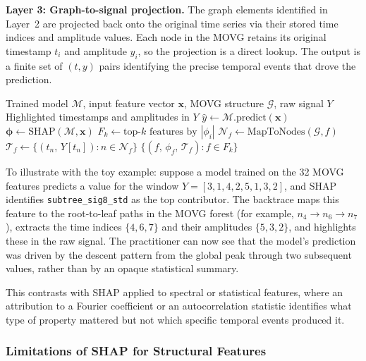 \documentclass[a4paper,12pt]{article}
\begin{document}
\textbf{Layer 3: Graph-to-signal projection.} The graph elements identified in Layer~2 are projected back onto the original time series via their stored time indices and amplitude values. Each node in the MOVG retains its original timestamp $t_i$ and amplitude $y_i$, so the projection is a direct lookup. The output is a finite set of $(t, y)$ pairs identifying the precise temporal events that drove the prediction.

\begin{algorithm}[H]
\caption{Post-Inference Backtrace}
\label{alg:backtrace}
\begin{algorithmic}[1]
\Require Trained model $\mathcal{M}$, input feature vector $\mathbf{x}$, MOVG structure $\mathcal{G}$, raw signal $Y$
\Ensure Highlighted timestamps and amplitudes in $Y$
    \State $\hat{y} \gets \mathcal{M}.\text{predict}(\mathbf{x})$
    \State $\boldsymbol{\phi} \gets \text{SHAP}(\mathcal{M}, \mathbf{x})$ 
    \State $F_k \gets \text{top-}k\text{ features by } |\phi_i|$
        \State $\mathcal{N}_f \gets \text{MapToNodes}(\mathcal{G}, f)$ 
        \State $\mathcal{T}_f \gets \{(t_n,\, Y[t_n]) : n \in \mathcal{N}_f\}$ 
    \EndFor
    \State \Return $\{(f,\, \phi_f,\, \mathcal{T}_f) : f \in F_k\}$
\EndFunction
\end{algorithmic}
\end{algorithm}

To illustrate with the toy example: suppose a model trained on the 32 MOVG features predicts a value for the window $Y = [3, 1, 4, 2, 5, 1, 3, 2]$, and SHAP identifies \texttt{subtree\_sig8\_std} as the top contributor. The backtrace maps this feature to the root-to-leaf paths in the MOVG forest (for example, $n_4 \to n_6 \to n_7$), extracts the time indices $\{4, 6, 7\}$ and their amplitudes $\{5, 3, 2\}$, and highlights these in the raw signal. The practitioner can now see that the model's prediction was driven by the descent pattern from the global peak through two subsequent values, rather than by an opaque statistical summary.

This contrasts with SHAP applied to spectral or statistical features, where an attribution to a Fourier coefficient or an autocorrelation statistic identifies what type of property mattered but not which specific temporal events produced it.

\subsubsection{Limitations of SHAP for Structural Features}
\end{document}
